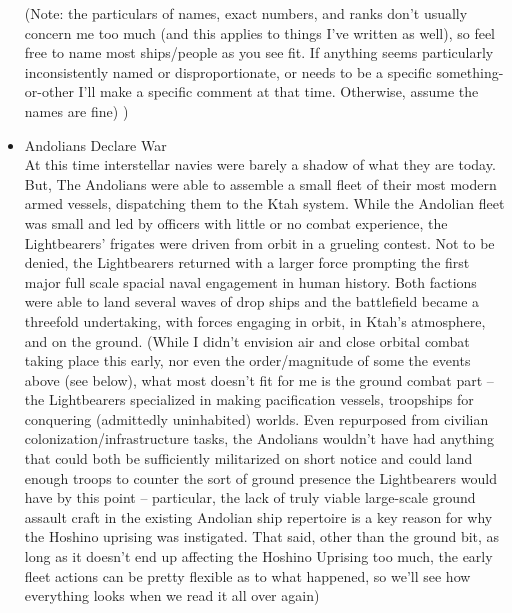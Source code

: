 \begin{itemize}
(Note: the particulars of names, exact numbers, and ranks don't
usually concern me too much (and this applies to things I've written
as well), so feel free to name most ships/people as you see fit. If
anything seems particularly inconsistently named or disproportionate,
or needs to be a specific something-or-other I'll make a specific
comment at that time. Otherwise, assume the names are fine) )

\item Andolians Declare War \\
	
At this time interstellar navies were barely a shadow of what they are
today.  But, The Andolians were able to assemble a small fleet of
their most modern armed vessels, dispatching them to the Ktah system.
While the Andolian fleet was small and led by officers with little or
no combat experience, the Lightbearers' frigates were driven from
orbit in a grueling contest.  Not to be denied, the Lightbearers
returned with a larger force prompting the first major full scale
spacial naval engagement in human history.  Both factions were able to
land several waves of drop ships and the battlefield became a
threefold undertaking, with forces engaging in orbit, in Ktah's
atmosphere, and on the ground. (While I didn't envision air and close
orbital combat taking place this early, nor even the order/magnitude
of some the events above (see below), what most doesn't fit for me is
the ground combat part -- the Lightbearers specialized
in making pacification vessels, troopships for conquering (admittedly
uninhabited) worlds. Even repurposed from civilian
colonization/infrastructure tasks, the Andolians wouldn't have had
anything that could both be sufficiently militarized on short notice
and could land enough troops to counter the sort of ground presence
the Lightbearers would have by this point --
particular, the lack of truly viable large-scale ground assault craft
in the existing Andolian ship repertoire is a key reason for why the
Hoshino uprising was instigated. That said, other than the ground bit,
as long as it doesn't end up affecting the Hoshino Uprising too much,
the early fleet actions can be pretty flexible as to what happened, so
we'll see how everything looks when we read it all over again)


\end{itemize}
